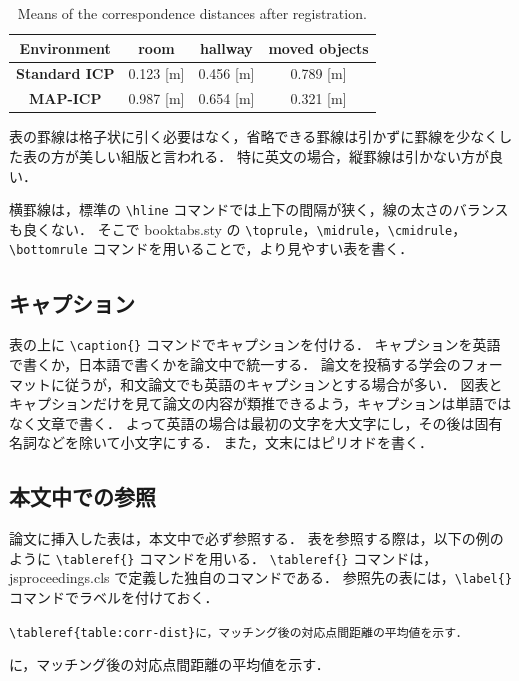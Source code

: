 \documentclass[uplatex, twocolumn, 9pt]{jsproceedings}
\begin{document}
\begin{table}
  \centering
  \caption{Means of the correspondence distances after registration.}
  \label{table:corr-dist}
  \begin{tabular}{cccc}
  \toprule%
  \textbf{Environment} & room & hallway & moved objects\\
  \midrule%
  \textbf{Standard ICP} & 0.123 [m] & 0.456 [m] & 0.789 [m]\\
  \textbf{MAP-ICP} & 0.987 [m] & 0.654 [m] & 0.321 [m]\\
  \bottomrule%
  \end{tabular}
\end{table}

表の罫線は格子状に引く必要はなく，省略できる罫線は引かずに罫線を少なくした表の方が美しい組版と言われる．
特に英文の場合，縦罫線は引かない方が良い．

横罫線は，標準の \verb*|\hline| コマンドでは上下の間隔が狭く，線の太さのバランスも良くない．
そこで booktabs.sty の \verb*|\toprule|，\verb*|\midrule|，\verb*|\cmidrule|，\verb*|\bottomrule| コマンドを用いることで，より見やすい表を書く．

\subsection{キャプション}
表の上に \verb*|\caption{}| コマンドでキャプションを付ける．
キャプションを英語で書くか，日本語で書くかを論文中で統一する．
論文を投稿する学会のフォーマットに従うが，和文論文でも英語のキャプションとする場合が多い．
図表とキャプションだけを見て論文の内容が類推できるよう，キャプションは単語ではなく文章で書く．
よって英語の場合は最初の文字を大文字にし，その後は固有名詞などを除いて小文字にする．
また，文末にはピリオドを書く．

\subsection{本文中での参照}
論文に挿入した表は，本文中で必ず参照する．
表を参照する際は，以下の例のように \verb*|\tableref{}| コマンドを用いる．
\verb*|\tableref{}| コマンドは，jsproceedings.cls で定義した独自のコマンドである．
参照先の表には，\verb*|\label{}| コマンドでラベルを付けておく．
\begin{description}[style=nextline]
  \item[\LaTeX ソース]%
  \verb|\tableref{table:corr-dist}に，マッチング後の対応点間距離の平均値を示す．|
  \item[出力]%
  に，マッチング後の対応点間距離の平均値を示す．
\end{description}
\end{document}
